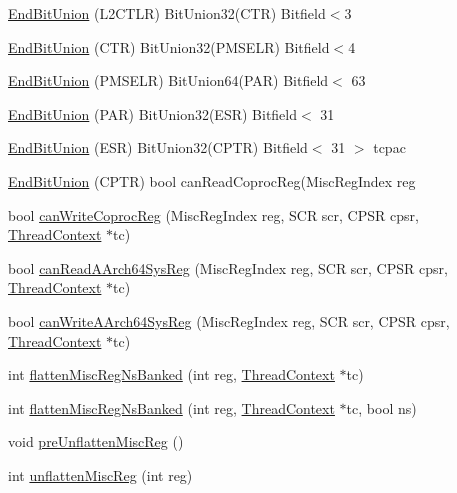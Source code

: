 \begin{DoxyCompactItemize}
\item 
\hyperlink{namespaceArmISA_a8323eeba8649b76b067550bd064b1b66}{EndBitUnion} (L2CTLR) BitUnion32(CTR) Bitfield$<$3
\item 
\hyperlink{namespaceArmISA_a6c853d07ef34ab3a6d9c93960f1fe8dc}{EndBitUnion} (CTR) BitUnion32(PMSELR) Bitfield$<$4
\item 
\hyperlink{namespaceArmISA_a9ac38e4e19b3a4b329b4a932f26e2e80}{EndBitUnion} (PMSELR) BitUnion64(PAR) Bitfield$<$ 63
\item 
\hyperlink{namespaceArmISA_a3c06d6bc35bdac0fbd0e84fe6ccb89e1}{EndBitUnion} (PAR) BitUnion32(ESR) Bitfield$<$ 31
\item 
\hyperlink{namespaceArmISA_a64622fb5c4eb20a958d7ae4f4278e77a}{EndBitUnion} (ESR) BitUnion32(CPTR) Bitfield$<$ 31 $>$ tcpac
\item 
\hyperlink{namespaceArmISA_a1cf76e328311605ff42b23e309741864}{EndBitUnion} (CPTR) bool canReadCoprocReg(MiscRegIndex reg
\item 
bool \hyperlink{namespaceArmISA_a2e301e058ae733d1d085ecb2a6958ee2}{canWriteCoprocReg} (MiscRegIndex reg, SCR scr, CPSR cpsr, \hyperlink{classThreadContext}{ThreadContext} $\ast$tc)
\item 
bool \hyperlink{namespaceArmISA_a631e5db7a6e20d5eba13d492df154a8f}{canReadAArch64SysReg} (MiscRegIndex reg, SCR scr, CPSR cpsr, \hyperlink{classThreadContext}{ThreadContext} $\ast$tc)
\item 
bool \hyperlink{namespaceArmISA_a78d046830c49b73bd443793718b42b2a}{canWriteAArch64SysReg} (MiscRegIndex reg, SCR scr, CPSR cpsr, \hyperlink{classThreadContext}{ThreadContext} $\ast$tc)
\item 
int \hyperlink{namespaceArmISA_a939d9e820fe2a05cb16413fe88dc1887}{flattenMiscRegNsBanked} (int reg, \hyperlink{classThreadContext}{ThreadContext} $\ast$tc)
\item 
int \hyperlink{namespaceArmISA_a7888b11e5bf3379194c85553739ea69f}{flattenMiscRegNsBanked} (int reg, \hyperlink{classThreadContext}{ThreadContext} $\ast$tc, bool ns)
\item 
void \hyperlink{namespaceArmISA_a5f0a0de1ca6721df6535485e46442faa}{preUnflattenMiscReg} ()
\item 
int \hyperlink{namespaceArmISA_a28e9bb9fbddb03ba2db47c80827e0851}{unflattenMiscReg} (int reg)
\end{DoxyCompactItemize}
